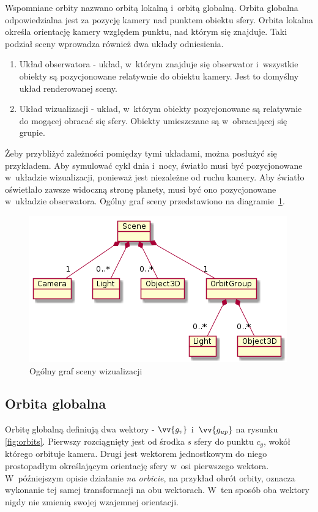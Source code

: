 Wspomniane orbity nazwano orbitą lokalną i~orbitą globalną. Orbita globalna odpowiedzialna jest za pozycję kamery nad punktem obiektu sfery. Orbita lokalna określa orientację kamery względem punktu, nad którym się znajduje. Taki podział sceny wprowadza również dwa układy odniesienia.

\begin{enumerate}
    \item Układ obserwatora - układ, w~którym znajduje się obserwator i~wszystkie obiekty są pozycjonowane relatywnie do obiektu kamery. Jest to domyślny układ renderowanej sceny.
    \item Układ wizualizacji - układ, w~którym obiekty pozycjonowane są relatywnie do mogącej obracać się sfery. Obiekty umieszczane są w~obracającej się grupie.
\end{enumerate}

Żeby przybliżyć zależności pomiędzy tymi układami, można posłużyć się przykładem. Aby symulować cykl dnia i~nocy, światło musi być pozycjonowane w~układzie wizualizacji, ponieważ jest niezależne od ruchu kamery. Aby światło oświetlało zawsze widoczną stronę planety, musi być ono pozycjonowane w~układzie obserwatora. Ogólny graf sceny przedstawiono na diagramie~\ref{fig:c3_scene_graph}.

\begin{figure}[h]
    \centering
    \includegraphics[scale=0.6]{diagrams/out/c3_scene_graph.png}
    \caption{Ogólny graf sceny wizualizacji}
    \label{fig:c3_scene_graph}
\end{figure}

\subsection{Orbita globalna}

Orbitę globalną definiują dwa wektory - $\vv{g_v}$ i~$\vv{g_{up}}$ na rysunku \ref{fig:orbits}. Pierwszy rozciągnięty jest od środka $s$ sfery do punktu $c_g$, wokół którego orbituje kamera. Drugi jest wektorem jednostkowym do niego prostopadłym określającym orientację sfery w~osi pierwszego wektora. W~późniejszym opisie działanie \textit{na orbicie}, na przykład obrót orbity, oznacza wykonanie tej samej transformacji na obu wektorach. W~ten sposób oba wektory nigdy nie zmienią swojej wzajemnej orientacji.

